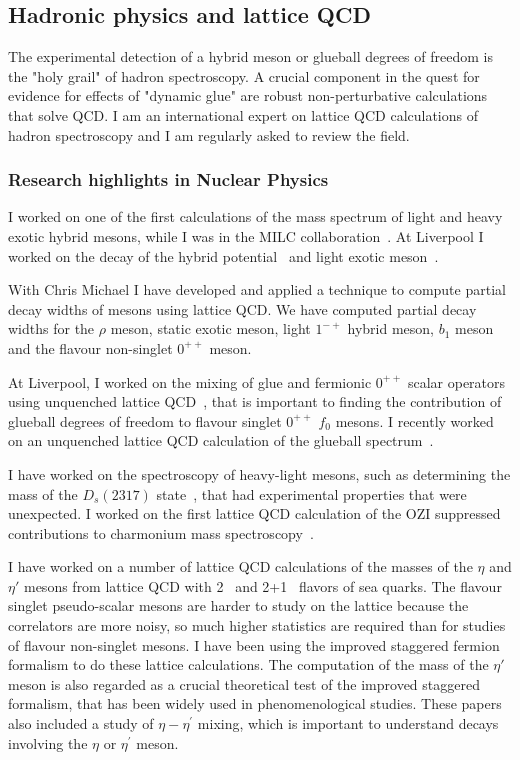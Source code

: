 \subsection{Hadronic physics and lattice QCD}


The experimental detection of a hybrid meson or glueball degrees of
freedom is the "holy grail" of hadron 
spectroscopy.  A crucial component
in the quest for evidence for effects of "dynamic glue"
 are robust non-perturbative calculations that solve QCD.  
I am an international expert on lattice QCD calculations
of hadron spectroscopy and I am regularly asked to review the field.


\subsubsection{Research highlights in Nuclear Physics}

I worked on
one of the first calculations of the mass spectrum 
of light and heavy exotic hybrid mesons,
while I was in the MILC collaboration~\cite{Bernard:1997ib}. 
At Liverpool I worked on the decay of the 
hybrid potential~\cite{McNeile:2002az} and light
exotic meson~\cite{McNeile:2006bz}.

With Chris Michael I have developed and applied a technique to compute
partial decay widths of mesons using lattice QCD.  We have computed 
partial decay widths for the $\rho$ meson, static exotic meson, light
$1^{-+}$ hybrid meson, $b_1$ meson and the flavour non-singlet $0^{++}$
meson.


At Liverpool, I worked on the
mixing of glue and fermionic $0^{++}$ scalar operators using
unquenched lattice QCD~\cite{McNeile:2001xx,Hart:2006ps}, 
that is important to finding the contribution
of glueball degrees of freedom to flavour singlet $0^{++}$ $f_0$ mesons.
I recently worked on an unquenched lattice QCD calculation
of the glueball spectrum~\cite{Richards:2010ck,Gregory:2012hu}.


I have worked on the spectroscopy of heavy-light mesons,
such as determining the mass of the 
$D_s(2317)$ state~\cite{Dougall:2003hv},
that had experimental properties that were unexpected.
I worked on the first lattice QCD calculation
of the OZI suppressed
contributions to charmonium 
mass spectroscopy~\cite{McNeile:2004wu}.


I have worked on a number of lattice QCD calculations 
of the masses of the $\eta$
and $\eta'$ mesons from lattice QCD with 
2~\cite{McNeile:2000hf} and 2+1~\cite{Gregory:2011sg} flavors of sea
quarks. The flavour singlet pseudo-scalar mesons are harder to study
on the lattice because the correlators are more noisy, so much higher
statistics are required than for studies of flavour non-singlet
mesons. I have been using the improved staggered fermion formalism to
do these lattice calculations. The computation of the mass of the
$\eta'$ meson is also regarded as a crucial theoretical test of the
improved staggered formalism, that has been widely used in
phenomenological studies. These papers also included a study
of $\eta-\eta^\prime$ mixing, which is important to understand 
decays involving the $\eta$ or $\eta^\prime$ meson.

